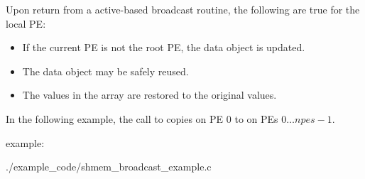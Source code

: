 \begin{apidefinition}
{\begin{DeprecateBlock}
	Upon return from a active-based broadcast routine, the following are true for the local
    \ac{PE}:
    \begin{itemize}
      \item If the current PE is not the root PE, the \dest{} data object is updated.
      \item The \source{} data object may be safely reused.
      \item The values in the  array are restored to the
        original values.
    \end{itemize}
\end{DeprecateBlock}
}




\begin{apiexamples}

\apicexample
    {In the following \Cstd[11] example, the call to  copies \source{}
    on \ac{PE} $0$ to \dest{} on \acp{PE} $0\dots npes-1$.

    \CorCpp{} example:}
    {./example_code/shmem_broadcast_example.c}
    {}

\end{apiexamples}

\end{apidefinition}
